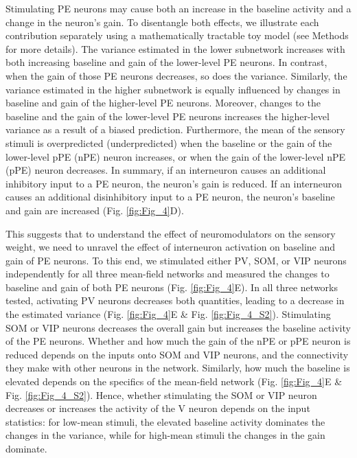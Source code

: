 \documentclass[10pt,a4paper,draft]{article}
\begin{document}
Stimulating PE neurons may cause both an increase in the baseline activity and a change in the neuron's gain. To disentangle both effects, we illustrate each contribution separately using a mathematically tractable toy model (see Methods for more details). The variance estimated in the lower subnetwork increases with both increasing baseline and gain of the lower-level PE neurons. In contrast, when the gain of those PE neurons decreases, so does the variance. Similarly, the variance estimated in the higher subnetwork is equally influenced by changes in baseline and gain of the higher-level PE neurons. Moreover, changes to the baseline and the gain of the lower-level PE neurons increases the higher-level variance as a result of a biased prediction. Furthermore, the mean of the sensory stimuli is overpredicted (underpredicted) when the baseline or the gain of the lower-level pPE (nPE) neuron increases, or when the gain of the lower-level nPE (pPE) neuron decreases. In summary, if an interneuron causes an additional inhibitory input to a PE neuron, the neuron's gain is reduced. If an interneuron causes an additional disinhibitory input to a PE neuron, the neuron's baseline and gain are increased (Fig. \ref{fig:Fig_4}D).

This suggests that to understand the effect of neuromodulators on the sensory weight, we need to unravel the effect of interneuron activation on baseline and gain of PE neurons. To this end, we stimulated either PV, SOM, or VIP neurons independently for all three mean-field networks and measured the changes to baseline and gain of both PE neurons (Fig. \ref{fig:Fig_4}E). In all three networks tested, activating PV neurons decreases both quantities, leading to a decrease in the estimated variance (Fig. \ref{fig:Fig_4}E \& Fig. \ref{fig:Fig_4_S2}). Stimulating SOM or VIP neurons decreases the overall gain but increases the baseline activity of the PE neurons. Whether and how much the gain of the nPE or pPE neuron is reduced depends on the inputs onto SOM and VIP neurons, and the connectivity they make with other neurons in the network. Similarly, how much the baseline is elevated depends on the specifics of the mean-field network (Fig. \ref{fig:Fig_4}E \& Fig. \ref{fig:Fig_4_S2}). Hence, whether stimulating the SOM or VIP neuron decreases or increases the activity of the V neuron depends on the input statistics: for low-mean stimuli, the elevated baseline activity dominates the changes in the variance, while for high-mean stimuli the changes in the gain dominate. 
\end{document}
